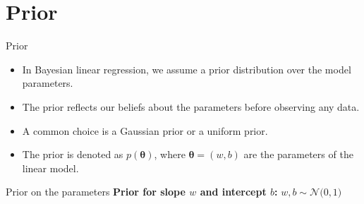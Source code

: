 \documentclass{beamer}
\begin{document}
  \section{Prior}

  \begin{frame}{Prior}
    \begin{itemize}
    \item In Bayesian linear regression, we assume a prior distribution over the model parameters.
    \item The prior reflects our beliefs about the parameters before observing any data.
    \item A common choice is a Gaussian prior or a uniform prior.
    \item The prior is denoted as \(p(\bm{\theta})\), where \(\bm{\theta} = (w, b)\) are the parameters of the linear model.
    \end{itemize}
\end{frame}



\begin{frame}{Prior on the parameters}
  \textbf{Prior for slope \(w\) and intercept \(b\):}
  \(
    w, b \sim \mathcal{N}\big(0, 1\big)
  \)

  \begin{center}
  \end{center}
\end{frame}
\end{document}
